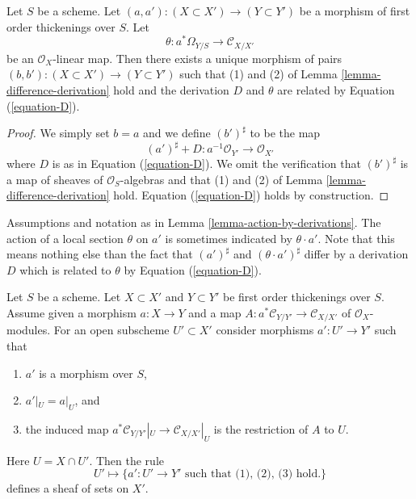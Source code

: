 \begin{lemma}
\label{lemma-action-by-derivations}
Let $S$ be a scheme.
Let $(a, a') : (X \subset X') \to (Y \subset Y')$
be a morphism of first order thickenings over $S$.
Let
$$
\theta : a^*\Omega_{Y/S} \to \mathcal{C}_{X/X'}
$$
be an $\mathcal{O}_X$-linear map. Then there exists a unique morphism of pairs
$(b, b') : (X \subset X') \to (Y \subset Y')$ such that
(1) and (2) of
Lemma \ref{lemma-difference-derivation}
hold and the derivation $D$ and $\theta$ are related by
Equation (\ref{equation-D}).
\end{lemma}

\begin{proof}
We simply set $b = a$ and we define $(b')^\sharp$ to be the map
$$
(a')^\sharp + D : a^{-1}\mathcal{O}_{Y'} \to \mathcal{O}_{X'}
$$
where $D$ is as in Equation (\ref{equation-D}). We omit the verification
that $(b')^\sharp$ is a map of sheaves of $\mathcal{O}_S$-algebras and
that (1) and (2) of
Lemma \ref{lemma-difference-derivation}
hold. Equation (\ref{equation-D}) holds by construction.
\end{proof}

\begin{remark}
\label{remark-action-by-derivations}
Assumptions and notation as in Lemma \ref{lemma-action-by-derivations}.
The action of a local section $\theta$ on $a'$ is sometimes indicated by
$\theta \cdot a'$. Note that this means nothing else than the fact
that $(a')^\sharp$ and $(\theta \cdot a')^\sharp$ differ by a derivation
$D$ which is related to $\theta$ by Equation (\ref{equation-D}).
\end{remark}

\begin{lemma}
\label{lemma-sheaf}
Let $S$ be a scheme.
Let $X \subset X'$ and $Y \subset Y'$ be first order thickenings
over $S$. Assume given a morphism $a : X \to Y$ and a map
$A : a^*\mathcal{C}_{Y/Y'} \to \mathcal{C}_{X/X'}$ of
$\mathcal{O}_X$-modules. For an open subscheme $U' \subset X'$
consider morphisms $a' : U' \to Y'$ such that
\begin{enumerate}
\item $a'$ is a morphism over $S$,
\item $a'|_U = a|_U$, and
\item the induced map
$a^*\mathcal{C}_{Y/Y'}|_U \to \mathcal{C}_{X/X'}|_U$
is the restriction of $A$ to $U$.
\end{enumerate}
Here $U = X \cap U'$. Then the rule
\begin{equation}
\label{equation-sheaf}
U' \mapsto
\{a' : U' \to Y'\text{ such that (1), (2), (3) hold.}\}
\end{equation}
defines a sheaf of sets on $X'$.
\end{lemma}

